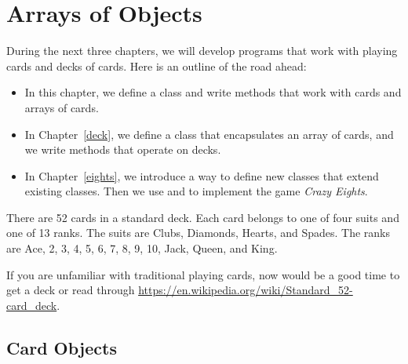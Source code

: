 \chapter{Arrays of Objects}

During the next three chapters, we will develop programs that work with playing cards and decks of cards.
Here is an outline of the road ahead:

\begin{itemize}

\item In this chapter, we define a  class and write methods that work with cards and arrays of cards.

\item In Chapter~\ref{deck}, we define a  class that encapsulates an array of cards, and we write methods that operate on decks.

\item In Chapter~\ref{eights}, we introduce a way to define new classes that extend existing classes.
Then we use  and  to implement the game {\it Crazy Eights}.

\end{itemize}




There are 52 cards in a standard deck.
Each card belongs to one of four suits and one of 13 ranks.
The suits are Clubs, Diamonds, Hearts, and Spades.
The ranks are Ace, 2, 3, 4, 5, 6, 7, 8, 9, 10, Jack, Queen, and King.

If you are unfamiliar with traditional playing cards, now would be a good time to get a deck or read through \url{https://en.wikipedia.org/wiki/Standard_52-card_deck}.


\section{Card Objects}


